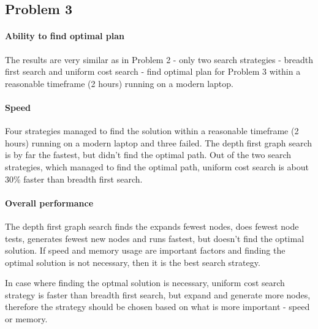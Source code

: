 \documentclass[11pt]{article}
\begin{document}
\subsection{Problem 3}

\paragraph{Ability to find optimal plan}

The results are very similar as in Problem 2 - only two search strategies - breadth first search and uniform cost search - find optimal plan for Problem 3 within a reasonable timeframe (2 hours) running on a modern laptop.

\paragraph{Speed}

Four strategies managed to find the solution within a reasonable timeframe (2 hours) running on a modern laptop and three failed. The depth first graph search is by far the fastest, but didn't find the optimal path. Out of the two search strategies, which managed to find the optimal path, uniform cost search is about 30\% faster than breadth first search. 

\paragraph{Overall performance}

The depth first graph search finds the expands fewest nodes, does fewest node tests, generates fewest new nodes and runs fastest, but doesn't find the optimal solution. If speed and memory usage are important factors and finding the optimal solution is not necessary, then it is the best search strategy.

In case where finding the optmal solution is necessary, uniform cost search strategy is faster than breadth first search, but expand and generate more nodes, therefore the strategy should be chosen based on what is more important - speed or memory.
\end{document}
